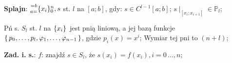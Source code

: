 
\entry
\textbf{Splajn}:
$\ipoints[0][n][a=][=b]{x_i}, s$
st. $l$ na $[a;b]$, gdy:
$s\in C^{l-1}[a;b]$;
$s\mid_{[x_i;x_{i+1}]} \in \mathbb{P}_l$;

\entry
Pń s. $S_l$ st. $l$ na $\ipoints{x_i}$ jest pnią liniową,
a jej bazą funkcje
$\set{p_0, \ldots, p_l, \varphi_1, \ldots, \varphi_{n-1}}$,
gdzie $p_i(x)=x^i$;
\entry
Wymiar tej pni to $(n+l)$;

\entry
\textbf{Zad. i. s.}:
$f$: znajdź $s\in S_l$, że
$s(x_i)=f(x_i), i=0\,\dots,n$;
